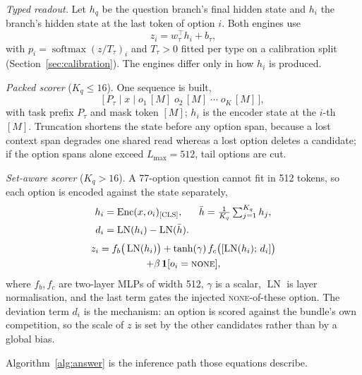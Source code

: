 \emph{Typed readout.} Let $h_q$ be the question branch's final hidden state and $h_i$ the branch's
hidden state at the last token of option $i$. Both engines use
\begin{equation}
z_i = w_\tau^{\top} h_i + b_\tau, \label{eq:readout}
\end{equation}
with $p_i=\operatorname{softmax}(z/T_\tau)_i$ and $T_\tau>0$ fitted per type on a calibration split
(Section~\ref{sec:calibration}). The engines
differ only in how $h_i$ is produced.

\emph{Packed scorer} ($K_q\le16$). One sequence is built,
\begin{equation}
\big[\,P_\tau\;|\;x\;|\;o_1\,[M]\;o_2\,[M]\;\cdots\;o_K\,[M]\,\big], \label{eq:packed}
\end{equation}
with task prefix $P_\tau$ and mask token $[M]$; $h_i$ is the encoder state at the $i$-th $[M]$.
Truncation shortens the state before any option span, because a lost context span degrades one
shared read whereas a lost option deletes a candidate; if the option spans alone exceed
$L_{\max}=512$, tail options are cut.

\emph{Set-aware scorer} ($K_q>16$). A 77-option question cannot fit in 512 tokens, so each option
is encoded against the state separately,
\begin{align}
h_i &= \operatorname{Enc}(x,o_i)_{\textsc{[CLS]}}, &
\bar h &= \tfrac{1}{K_q}\textstyle\sum_{j=1}^{K_q} h_j, \label{eq:seth}\\
d_i &= \operatorname{LN}(h_i)-\operatorname{LN}(\bar h). & &
\label{eq:dev}
\end{align}
\begin{multline}
z_i = f_b\big(\operatorname{LN}(h_i)\big)
 + \tanh(\gamma)\, f_c\big([\operatorname{LN}(h_i);\,d_i]\big) \\
 + \beta\,\mathbf{1}[o_i=\textsc{none}], \label{eq:setscore}
\end{multline}
where $f_b,f_c$ are two-layer MLPs of width 512, $\gamma$ is a scalar, $\operatorname{LN}$ is layer
normalisation, and the last term gates the injected \textsc{none}-of-these option. The deviation
term $d_i$ is the mechanism: an option is scored against the bundle's own competition, so the scale
of $z$ is set by the other candidates rather than by a global bias.

Algorithm~\ref{alg:answer} is the inference path those equations describe.

